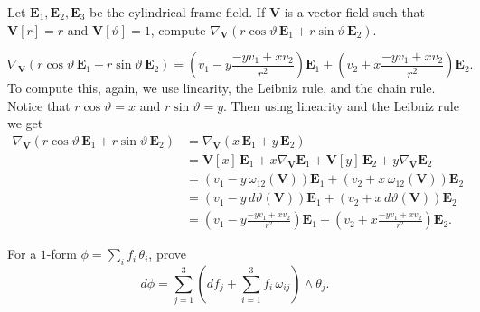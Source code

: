 \documentclass[12 pt, letterpaper]{hmcpset}
\begin{document}
\pagebreak

\begin{problem}[Problem 4.]
	Let $\mathbf{E}_{1}, \mathbf{E}_{2}, \mathbf{E}_{3}$ be the cylindrical frame field. If $\mathbf{V}$ is a vector field such that $\mathbf{V}[r] = r$ and $\mathbf{V}[\vartheta] = 1$, compute $\nabla_{\mathbf{V}}(r \cos{\vartheta} \, \mathbf{E}_{1} + r \sin{\vartheta} \, \mathbf{E}_{2})$.
\end{problem}

\begin{solution}
	\[
		\boxed{
			\nabla_{\mathbf{V}}(r \cos{\vartheta} \, \mathbf{E}_{1} + r \sin{\vartheta} \, \mathbf{E}_{2}) = \left ( v_{1} - y \frac{-y v_{1} + x v_{2}}{r^{2}} \right ) \mathbf{E}_{1} + \left ( v_{2} + x \frac{-y v_{1} + x v_{2}}{r^{2}} \right ) \mathbf{E}_{2}.
		}
	\]
	To compute this, again, we use linearity, the Leibniz rule, and the chain rule.	
	Notice that $r \cos{\vartheta} = x$ and $r \sin{\vartheta} = y$. Then using linearity and the Leibniz rule we get
	\[
		\begin{split}
			\nabla_{\mathbf{V}}(r \cos{\vartheta} \, \mathbf{E}_{1} + r \sin{\vartheta} \, \mathbf{E}_{2}) & = \nabla_{\mathbf{V}}(x \, \mathbf{E}_{1} + y \, \mathbf{E}_{2}) \\
														       & = \mathbf{V}[x] \, \mathbf{E}_{1} + x \nabla_{\mathbf{V}} \mathbf{E}_{1} + \mathbf{V}[y] \, \mathbf{E}_{2} + y \nabla_{\mathbf{V}} \mathbf{E}_{2} \\
														       & = (v_{1} - y \, \omega_{12}(\mathbf{V})) \mathbf{E}_{1} + (v_{2} + x \, \omega_{12}(\mathbf{V})) \mathbf{E}_{2} \\
														       & = (v_{1} - y \, d\vartheta(\mathbf{V})) \mathbf{E}_{1} + (v_{2} + x \, d\vartheta(\mathbf{V})) \mathbf{E}_{2} \\
														       & = \left ( v_{1} - y \frac{-y v_{1} + x v_{2}}{r^{2}} \right ) \mathbf{E}_{1} + \left ( v_{2} + x \frac{-y v_{1} + x v_{2}}{r^{2}} \right ) \mathbf{E}_{2}.
		\end{split}
	\]
\end{solution}

\pagebreak

\begin{problem}[Problem 5.]
	For a $1$-form $\phi = \sum_{i} f_{i} \, \theta_{i}$, prove
	\[
		d \phi = \sum_{j = 1}^{3} \left ( df_{j} + \sum_{i = 1}^{3} f_{i} \, \omega_{ij} \right ) \wedge \theta_{j}.
	\]
\end{problem}
\end{document}
